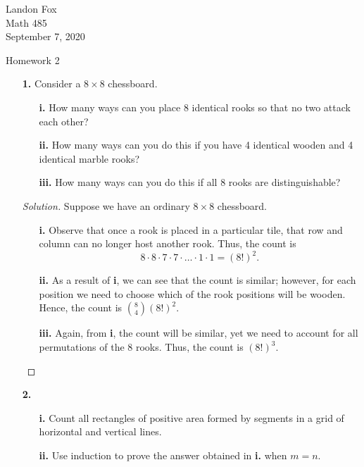 \documentclass[ 12pt ]{article}
\begin{document}
\noindent Landon Fox \\
\noindent Math 485 \\
\noindent September 7, 2020

\begin{center}
\Large Homework 2
\end{center}

\begin{enumerate}
	\item[\textbf{1.}] Consider a $8 \times 8$ chessboard.
		\begin{enumerate}
			\item[\textbf{i.}] How many ways can you place 8 identical rooks so that no two attack each other?
			\item[\textbf{ii.}] How many ways can you do this if you have 4 identical wooden and 4 identical marble rooks?
			\item[\textbf{iii.}] How many ways can you do this if all 8 rooks are distinguishable?
		\end{enumerate}

		\begin{proof}[Solution]
			Suppose we have an ordinary $8 \times 8$ chessboard.
			\begin{enumerate}
				\item[\textbf{i.}] Observe that once a rook is placed in a particular tile, that row and column can no longer host another rook. Thus, the count is
					$$8 \cdot 8 \cdot 7 \cdot 7 \cdot \hdots \cdot 1 \cdot 1 = (8!)^2.$$
				\item[\textbf{ii.}] As a result of \textbf{i}, we can see that the count is similar; however, for each position we need to choose which of the rook
					positions will be wooden. Hence, the count is $\binom{8}{4}(8!)^2$.
				\item[\textbf{iii.}] Again, from \textbf{i}, the count will be similar, yet we need to account for all permutations of the 8 rooks. Thus, the count is
					$(8!)^3$.
			\end{enumerate}
		\end{proof}


	\item[\textbf{2.}]
		\begin{enumerate}
			\item[\textbf{i.}] Count all rectangles of positive area formed by segments in a grid of horizontal and vertical lines.
			\item[\textbf{ii.}] Use induction to prove the answer obtained in \textbf{i.} when $m = n$.
		\end{enumerate}


\end{enumerate}
\end{document}

